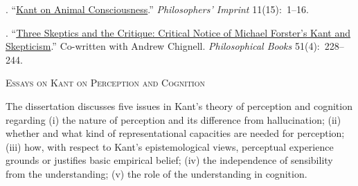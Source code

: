\documentclass[11pt]{article}
\begin{document}
. ``\href{http://quod.lib.umich.edu/cgi/p/pod/dod-idx?c=phimp;idno=3521354.0011.015}{Kant on Animal Consciousness}.'' \emph{Philosophers’ Imprint} 11(15):~1--16. 

. ``\href{http://onlinelibrary.wiley.com/doi/10.1111/j.1468-0149.2010.00513.x/abstract}{Three Skeptics and the Critique: Critical Notice of Michael Forster’s Kant and Skepticism}.'' Co-written with Andrew Chignell. 
 \emph{Philosophical Books} 51(4):~228--244.

\bigskip




 






\medskip

\ind \textsc{Essays on Kant on Perception and Cognition}
\medskip

\noindent The dissertation discusses five issues in Kant’s theory of perception and cognition regarding (i) the nature of perception and its difference from hallucination; (ii) whether and what kind of representational capacities are needed for perception; (iii) how, with respect to Kant’s epistemological views, perceptual experience grounds or justifies basic empirical belief; (iv) the independence of sensibility from the understanding; (v) the role of the understanding in cognition. 
\end{document}
